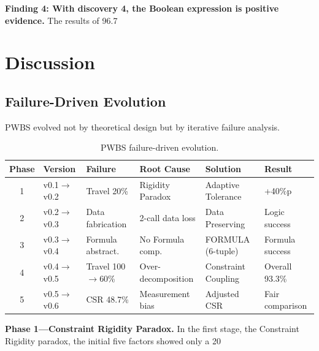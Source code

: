 \documentclass[11pt,a4paper]{article}
\begin{document}
\textbf{Finding 4: With discovery 4, the Boolean expression is positive evidence.} The results of 96.7%

\section{Discussion}

\subsection{Failure-Driven Evolution}
\label{sec:evolution}

PWBS evolved not by theoretical design but by iterative failure analysis.

\begin{table}[h]
\centering
\caption{PWBS failure-driven evolution.}
\label{tab:evolution}
\small
\begin{tabular}{clllll}
\toprule
\textbf{Phase} & \textbf{Version} & \textbf{Failure} & \textbf{Root Cause} & \textbf{Solution} & \textbf{Result} \\
\midrule
1 & v0.1$\to$v0.2 & Travel 20\% & Rigidity Paradox & Adaptive Tolerance & +40\%p \\
2 & v0.2$\to$v0.3 & Data fabrication & 2-call data loss & Data Preserving & Logic success \\
3 & v0.3$\to$v0.4 & Formula abstract. & No Formula comp. & FORMULA (6-tuple) & Formula success \\
4 & v0.4$\to$v0.5 & Travel 100$\to$60\% & Over-decomposition & Constraint Coupling & Overall 93.3\% \\
5 & v0.5$\to$v0.6 & CSR 48.7\% & Measurement bias & Adjusted CSR & Fair comparison \\
\bottomrule
\end{tabular}
\end{table}

\textbf{Phase 1---Constraint Rigidity Paradox.} In the first stage, the Constraint Rigidity paradox, the initial five factors showed only a 20%
\end{document}
